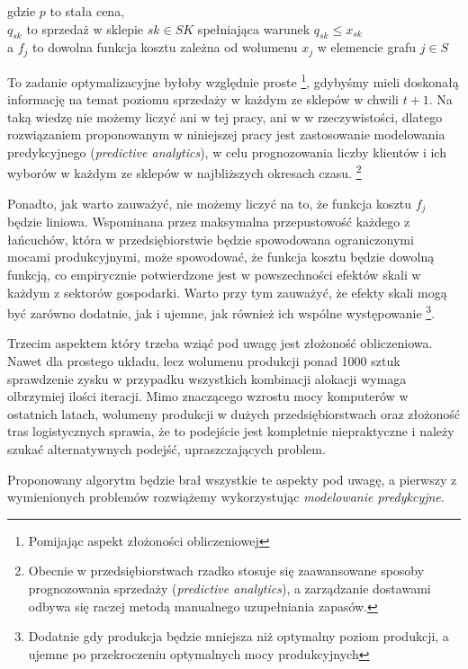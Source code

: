\documentclass[polish, twoside, 12pt, a4paper]{article}
\theoremstyle{definition}
\theoremstyle{plain}
\theoremstyle{remark}
\begin{document}
\begin{center} gdzie $p$ to stała cena, \\ $q_{sk}$ to sprzedaż w sklepie $sk \in SK$ spełniająca warunek $q_{sk} \le x_{sk}$ \\ a $f_j$ to dowolna funkcja kosztu zależna od wolumenu $x_j$ w elemencie grafu $j \in S$ \end{center}

To zadanie optymalizacyjne byłoby względnie proste \footnote{Pomijając aspekt złożoności obliczeniowej}, gdybyśmy mieli doskonałą informację na temat poziomu sprzedaży w każdym ze sklepów w chwili $ t + 1 $. Na taką wiedzę nie możemy liczyć ani w tej pracy, ani w w rzeczywistości, dlatego rozwiązaniem proponowanym w niniejszej pracy jest zastosowanie modelowania predykcyjnego (\textit{predictive analytics}), w celu prognozowania liczby klientów i ich wyborów w każdym ze sklepów w najbliższych okresach czasu. \footnote{Obecnie w przedsiębiorstwach rzadko stosuje się zaawansowane sposoby prognozowania sprzedaży (\textit{predictive analytics}), a zarządzanie dostawami odbywa się raczej metodą manualnego uzupełniania zapasów.} 

Ponadto, jak warto zauważyć, nie możemy liczyć na to, że funkcja kosztu $f_j$ będzie liniowa. Wspominana przez \cite{Kawa2010} maksymalna przepustowość każdego z łańcuchów, która w przedsiębiorstwie będzie spowodowana ograniczonymi mocami produkcyjnymi, może spowodować, że funkcja kosztu będzie dowolną funkcją, co empirycznie potwierdzone jest w powszechności efektów skali w każdym z sektorów gospodarki. Warto przy tym zauważyć, że efekty skali mogą być zarówno dodatnie, jak i ujemne, jak również ich wspólne występowanie \footnote{Dodatnie gdy produkcja będzie mniejsza niż optymalny poziom produkcji, a ujemne po przekroczeniu optymalnych mocy produkcyjnych}.

Trzecim aspektem który trzeba wziąć pod uwagę jest złożoność obliczeniowa. Nawet dla prostego układu, lecz wolumenu produkcji ponad 1000 sztuk sprawdzenie zysku w przypadku wszystkich kombinacji alokacji wymaga olbrzymiej ilości iteracji. Mimo znaczącego wzrostu mocy komputerów w ostatnich latach, wolumeny produkcji w dużych przedsiębiorstwach oraz złożoność tras logistycznych sprawia, że to podejście jest kompletnie niepraktyczne i należy szukać alternatywnych podejść, upraszczających problem.

 Proponowany algorytm będzie brał wszystkie te aspekty pod uwagę, a pierwszy z wymienionych problemów rozwiążemy wykorzystując  \textit{modelowanie predykcyjne}.
\end{document}
